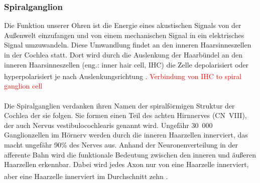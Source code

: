 \documentclass[12pt,a4paper,pdftex]{article}
\begin{document}
\subsubsection{Spiralganglion}
Die Funktion unserer Ohren ist die Energie eines akustischen Signals von der Außenwelt einzufangen und von einem mechanischen Signal in ein elektrisches Signal umzuwandeln. Diese Umwandlung findet an den inneren Haarsinneszellen in der Cochlea statt. Dort wird durch die Auslenkung der Haarbündel an den inneren Haarsinneszellen (eng.: inner hair cell, IHC) die Zelle depolarisiert oder hyperpolarisiert je nach Auslenkungsrichtung \textsuperscript{\cite[30]{kandel2013principles}}. 
\textcolor{red}{Verbindung von IHC to spiral ganglion cell}
\\
\\
Die Spiralganglien verdanken ihren Namen der spiralförmigen Struktur der Cochlea der sie folgen. Sie formen einen Teil des achten Hirnnerves (CN~VIII), der auch Nervus vestibulocochlearis genannt wird. Ungefähr 30~000 Ganglionzellen im Hörnerv werden durch die inneren Haarzellen innerviert, das macht ungefähr 90\% des Nerves aus. Anhand der Neuronenverteilung in der afferente Bahn wird die funktionale Bedeutung zwischen den inneren und äußeren Haarzellen erkennbar. Dabei wird jedes Axon nur von eine Haarzelle innerviert, aber eine Haarzelle innerviert im Durchschnitt zehn  \textsuperscript{\cite[30]{kandel2013principles}}. 
\end{document}
